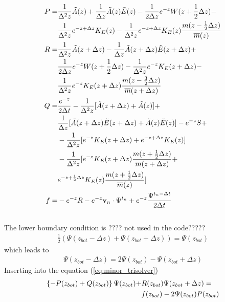 \begin{align}
 P =& \frac{1}{\Delta^2 z}\tilde{A}(z)+ \frac{1}{\Delta
 z}\tilde{A}(z)\tilde{E}(z) - \frac{1}{2 \Delta z} e^{-z} W(z+\frac{1}{2}\Delta
 z)- \notag \\
 {} & \frac{1}{\Delta^2 z} e^{-z+\Delta z}K_E(z) - \frac{1}{\Delta^2 z}e^{-z+\Delta
 z}K_E(z)\frac{m(z-\frac{1}{2}\Delta z)}{\overline{m}(z)} \\
%
 R =& \frac{1}{\Delta^2 z}\tilde{A}(z+\Delta z)- \frac{1}{\Delta
 z}\tilde{A}(z+\Delta z)\tilde{E}(z+\Delta z) + \notag \\
 {} & \frac{1}{2 \Delta z} e^{-z} W(z+\frac{1}{2}\Delta
 z)- \frac{1}{\Delta^2 z} e^{-z}K_E(z+\Delta z) - \notag \\
 {} & \frac{1}{\Delta^2 z}e^{-z}K_E(z+\Delta z)
 \frac{m(z-\frac{3}{2}\Delta z)}{\overline{m}(z+\Delta z)} \\
%
 Q =& \frac{e^{-z}}{2 \Delta t} - \frac{1}{\Delta^2 z}[\tilde{A}(z+\Delta z)+\tilde{A}(z)]+
   \notag \\
  {} & \frac{1}{\Delta
 z}[\tilde{A}(z+\Delta z)\tilde{E}(z+\Delta z)+\tilde{A}(z)\tilde{E}(z)]-e^{-z}S
 + \notag \\
 {} &
 - \frac{1}{\Delta^2 z} [e^{-z}K_E(z+\Delta z)+ e^{-z+\Delta
 z}K_E(z)] \notag \\
 {} & - \frac{1}{\Delta^2 z}[e^{-z}K_E(z+\Delta z)
 \frac{m(z+\frac{1}{2}\Delta z)}{\overline{m}(z+\Delta z)} + \notag \\
 {} & e^{-z+\frac{1}{2}\Delta z}K_E(z)
 \frac{m(z+\frac{1}{2}\Delta z)}{\overline{m}(z)}]\\
%
 f =& -e^{-z}R -e^{-z}\mathbf{v}_n\cdot \Psi^{t_n} + e^{-z}\frac{\Psi^{t_n-\Delta t}}{2 \Delta t}
\end{align}
%
\\

The lower boundary condition is ???? not used in the code?????
%
\begin{align}
  \frac{1}{2}(\Psi(z_{bot}-\Delta z) + \Psi(z_{bot}+\Delta z)) = \Psi(z_{bot})
\end{align}
%
which leads to
%
\begin{align}
  \Psi(z_{bot}-\Delta z) = 2 \Psi(z_{bot}) - \Psi(z_{bot}+\Delta z)
\end{align}
%
Inserting into the equation (\ref{eq:minor_trisolver})
%
\begin{align}
  \left\{ -P(z_{bot}) + Q(z_{bot})\right\} \Psi(z_{bot}) +& R(z_{bot}) \Psi(z_{bot}+\Delta
  z) = \notag \\
  {} & f(z_{bot}) - 2 \Psi(z_{bot})P(z_{bot})
\end{align}
%
\\

